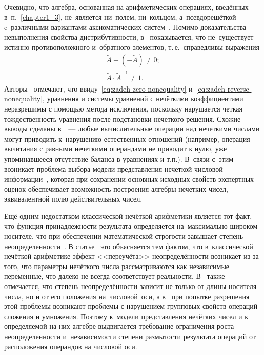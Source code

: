 Очевидно, что алгебра, основанная на арифметических операциях, введённых в~п.~\ref{chapter1_3}, не~является ни~полем, ни~кольцом, а~псевдорешёткой~\cite{Kaufmann, Fuzzy_Lattices} c~различными вариантами аксиоматических систем~\cite{Axioms_Fuzzy_Algebra, Philosophy_Fuzzy_Structures}. Помимо доказательства невыполнения свойства дистрибутивности, в~\cite{Pospelov, Borisov_Alexeev_Msk, Yakhyaeva, Yager_Arithmetics} показывается, что не~существует истинно противоположного и~обратного элементов, т.\,е.~справедливы выражения
\begin{gather}
	\label{eq:zadeh-zero-nonequality}
	\tilde{A}+\left( -\tilde{A} \right)\ne 0; \\
	\label{eq:zadeh-reverse-nonequality}
	\tilde{A}\cdot {{\tilde{A}}^{-1}}\ne 1.
\end{gather}
Авторы~\cite{Rutkovskaya} отмечают, что ввиду~\eqref{eq:zadeh-zero-nonequality} и~\eqref{eq:zadeh-reverse-nonequality}, уравнения и системы уравнений с нечёткими коэффициентами неразрешимы с помощью метода исключения, поскольку нарушается четкая тождественность уравнения после подстановки нечеткого решения. Схожие выводы сделаны в~\cite{Sokolov, Bocharnkinov_Ukraine}~--- любые вычислительные операции над нечеткими числами могут приводить к~нарушению естественных отношений (например, операция вычитания с равными нечеткими операндами не приводит к нулю, уже упоминавшееся отсутствие баланса в уравнениях и т.п.). В~связи с~этим возникает проблема выбора модели представления нечеткой числовой информации~\cite{Koroteev_Fuzzy_Arithmetics}, которая при сохранении основных исходных свойств экспертных оценок обеспечивает возможность построения алгебры нечетких чисел, эквивалентной полю действительных чисел. 

Ещё одним недостатком классической нечёткой арифметики является тот факт, что функция принадлежности результата определяется 
на~максимально широком носителе, что при обеспечении математической строгости завышает степень неопределенности~\cite{Evdokimov, Kreinovich_100plus1, Hanss_Engineering}. В статье~\cite{Hanss_Strict_Arithmetic} это объясняется тем фактом, что в~классической нечёткой арифметике эффект <<переучёта>> неопределённости возникает из-за того, что параметры нечёткого числа рассматриваются как независимые переменные, что далеко не всегда соответствует реальности. В~\cite{Yakhyaeva} также отмечается, что степень неопределённости зависит не только от длины носителя числа, но и от его положения на~числовой~оси, а в~\cite{Kreinovich_100plus1} при попытке разрешения этой проблемы возникают проблемы с нарушением групповых свойств операций сложения и умножения. Поэтому к~модели представления нечётких чисел и к определяемой на них алгебре выдвигается требование ограничения роста неопределенности и~независимости степени размытости результата операций от расположения операндов на числовой оси.

